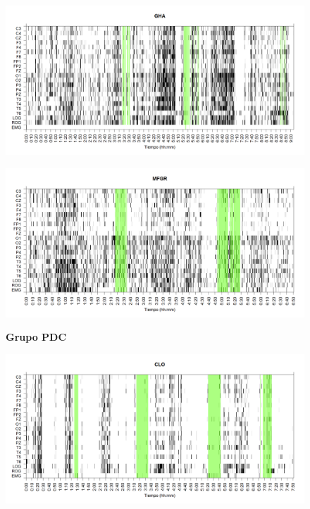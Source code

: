 \documentclass[12pt,a4paper]{mitthesis}
\begin{document}
\begin{figure}
\centering
\includegraphics[width=0.8\linewidth]
{./g170413/GH24031950SUENNO_est.png} 
\label{grf_GHA}
\end{figure}

\begin{figure}
\centering
\includegraphics[width=0.8\linewidth]
{./g170413/GURM251148SUE_est.png} 
\label{grf_MFGR}
\end{figure}



\begin{figure}
\Large{\textbf{Grupo PDC}}
\end{figure}

\begin{figure}
\centering
\includegraphics[width=0.8\linewidth]
{./g170413/CLMN10SUE_est.png} 
\label{grf_CLO}
\end{figure}
\end{document}
